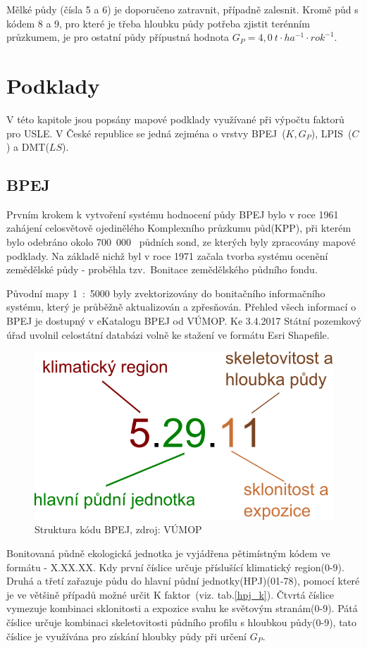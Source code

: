 Mělké půdy (čísla 5 a 6) je doporučeno zatravnit, případně
zalesnit. Kromě půd s kódem 8 a 9, pro které je třeba hloubku půdy
potřeba zjistit terénním průzkumem, je pro ostatní půdy přípustná
hodnota $G_P=4,0~t\cdot ha^{-1}\cdot rok^{-1}$.\cite{Novotny2014}
\newpage
\chapter{Podklady}
V této kapitole jsou popsány mapové podklady využívané při výpočtu 
faktorů pro USLE. V České republice se jedná zejména o vrstvy 
BPEJ~($K, G_P$), LPIS~($C$) a DMT($LS$).
\section{BPEJ}
Prvním krokem k vytvoření systému hodnocení půdy BPEJ bylo v roce 1961
zahájení celosvětově ojedinělého Komplexního průzkumu půd(KPP), při
kterém bylo odebráno okolo 700~000~ půdních sond, ze kterých byly
zpracovány mapové podklady. Na základě nichž byl v roce 1971 začala
tvorba systému ocenění zemědělské půdy - proběhla tzv.~Bonitace
zemědělského půdního fondu.

Původní mapy 1~:~5000 byly zvektorizovány do bonitačního informačního
systému, který je průběžně aktualizován a zpřesňován. Přehled všech
informací o BPEJ je dostupný v eKatalogu BPEJ od
VÚMOP\cite{bpej_vumop}. Ke 3.4.2017 Státní pozemkový úřad uvolnil
celostátní databázi volně ke stažení ve formátu Esri Shapefile\cite{spucr}.
\begin{figure}[H]
    \centering
    \includegraphics[scale=0.5]{./pictures/Struktura_BPEJ.png}
      \caption[Struktura kódu BPEJ]{Struktura kódu BPEJ, zdroj:
        VÚMOP\cite{bpej_vumop}}
      \label{fig:struktura_bpej}
\end{figure}
Bonitovaná půdně ekologická jednotka je vyjádřena pětimístným kódem ve
formátu - X.XX.XX. Kdy první číslice určuje příslušící klimatický
region(0-9). Druhá a třetí zařazuje půdu do hlavní půdní
jednotky(HPJ)(01-78), pomocí které je ve většině případů možné určit K
faktor~(viz. tab.\ref{hpj_k}). Čtvrtá číslice vymezuje kombinaci
sklonitosti a expozice svahu ke světovým stranám(0-9). Pátá číslice
určuje kombinaci skeletovitosti půdního profilu s hloubkou půdy(0-9),
tato číslice je využívána pro získání hloubky půdy při určení
$G_P$.\cite{Novotny2013}
